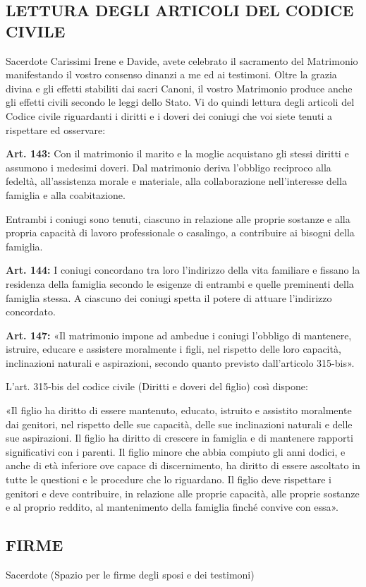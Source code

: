 
\subsection*{LETTURA DEGLI ARTICOLI DEL CODICE CIVILE}

\begin{dialoghi}
\item[Sacerdote] Carissimi Irene e Davide, avete celebrato il sacramento del Matrimonio manifestando il vostro consenso dinanzi a me ed ai testimoni. Oltre la grazia divina e gli effetti stabiliti dai sacri Canoni, il vostro Matrimonio produce anche gli effetti civili secondo le leggi dello Stato. Vi do quindi lettura degli articoli del Codice civile riguardanti i diritti e i doveri dei coniugi che voi siete tenuti a rispettare ed osservare:

\textbf{Art. 143:} Con il matrimonio il marito e la moglie acquistano gli stessi diritti e assumono i medesimi doveri. Dal matrimonio deriva l'obbligo reciproco alla fedeltà, all'assistenza morale e materiale, alla collaborazione nell'interesse della famiglia e alla coabitazione.

Entrambi i coniugi sono tenuti, ciascuno in relazione alle proprie sostanze e alla propria capacità di lavoro professionale o casalingo, a contribuire ai bisogni della famiglia.

\textbf{Art. 144:} I coniugi concordano tra loro l'indirizzo della vita familiare e fissano la residenza della famiglia secondo le esigenze di entrambi e quelle preminenti della famiglia stessa. A ciascuno dei coniugi spetta il potere di attuare l'indirizzo concordato.

\textbf{Art. 147:} «Il matrimonio impone ad ambedue i coniugi l'obbligo di mantenere, istruire, educare e assistere moralmente i figli, nel rispetto delle loro capacità, inclinazioni naturali e aspirazioni, secondo quanto previsto dall'articolo 315-bis».

L'art. 315-bis del codice civile (Diritti e doveri del figlio) così dispone:

«Il figlio ha diritto di essere mantenuto, educato, istruito e assistito moralmente dai genitori, nel rispetto delle sue capacità, delle sue inclinazioni naturali e delle sue aspirazioni. Il figlio ha diritto di crescere in famiglia e di mantenere rapporti significativi con i parenti. Il figlio minore che abbia compiuto gli anni dodici, e anche di età inferiore ove capace di discernimento, ha diritto di essere ascoltato in tutte le questioni e le procedure che lo riguardano. Il figlio deve rispettare i genitori e deve contribuire, in relazione alle proprie capacità, alle proprie sostanze e al proprio reddito, al mantenimento della famiglia finché convive con essa».
\end{dialoghi}

\subsection*{FIRME}

\begin{dialoghi}
\item[Sacerdote] (Spazio per le firme degli sposi e dei testimoni)
\end{dialoghi}